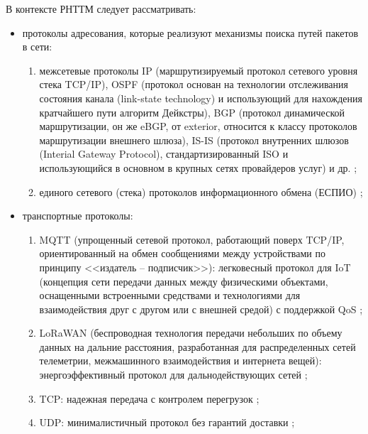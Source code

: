 В контексте РНТТМ следует рассматривать:
\begin{itemize}[beginpenalty=10000, midpenalty=10000, wide=\parindent, leftmargin=0pt]
	\item протоколы адресования, которые реализуют механизмы поиска путей пакетов в сети:
		\begin{enumerate}[beginpenalty=10000, midpenalty=10000, wide=\parindent, leftmargin=0pt]
			\item межсетевые протоколы IP (маршрутизируемый протокол сетевого уровня стека TCP/IP),
			OSPF (протокол основан на технологии отслеживания состояния канала (link-state technology) и использующий для нахождения кратчайшего пути алгоритм Дейкстры),
			BGP (протокол динамической маршрутизации, он же eBGP, от exterior, относится к классу протоколов маршрутизации внешнего шлюза),
			IS-IS (протокол внутренних шлюзов (Interial Gateway Protocol), стандартизированный ISO и использующийся в основном в крупных сетях провайдеров услуг)
			и др. \cite{ComputerNetwork};

			\item единого сетевого (стека) протоколов информационного обмена (ЕСПИО) \cite{ESPIO};
		\end{enumerate}

	\item транспортные протоколы:
		\begin{enumerate}[beginpenalty=10000, midpenalty=10000, wide=\parindent, leftmargin=0pt]
			\item MQTT (упрощенный сетевой протокол, работающий поверх TCP/IP, ориентированный на обмен сообщениями между устройствами по принципу <<издатель -- подписчик>>):
			легковесный протокол для IoT (концепция сети передачи данных между физическими объектами, оснащенными встроенными средствами и технологиями для взаимодействия друг с другом или с внешней средой) с поддержкой QoS \cite{Munister};

			\item LoRaWAN (беспроводная технология передачи небольших по объему данных на дальние расстояния, разработанная для распределенных сетей телеметрии, межмашинного взаимодействия и интернета вещей):
			энергоэффективный протокол для дальнодействующих сетей \cite{PerryLi};

			\item TCP:
			надежная передача с контролем перегрузок \cite{TCP_IP, habr2021tcp};

			\item UDP:
			минималистичный протокол без гарантий доставки \cite{ComputerNetwork};


\end{enumerate}
\end{itemize}
